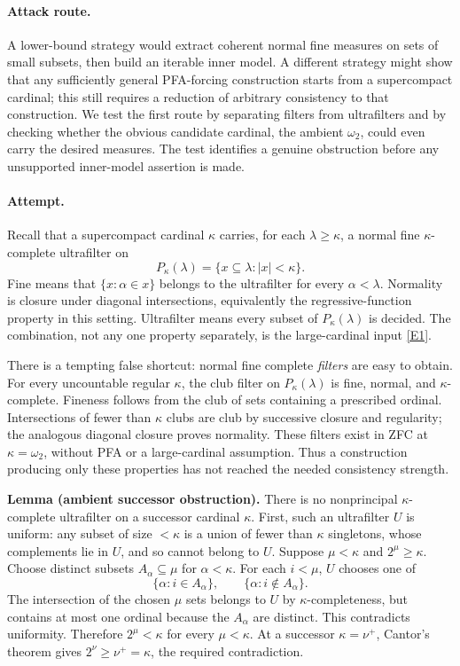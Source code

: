 \documentclass[11pt,a4paper]{article}
\newcommand{\eref}[2]{\hyperlink{extra:#1:#2}{[E#2]}}
\numberwithin{equation}{section}
\begin{document}
\paragraph{Attack route.}
A lower-bound strategy would extract coherent normal fine measures on sets of small subsets, then build an iterable inner model. A different strategy might show that any sufficiently general PFA-forcing construction starts from a supercompact cardinal; this still requires a reduction of arbitrary consistency to that construction. We test the first route by separating filters from ultrafilters and by checking whether the obvious candidate cardinal, the ambient $\omega_2$, could even carry the desired measures. The test identifies a genuine obstruction before any unsupported inner-model assertion is made.

\paragraph{Attempt.}
Recall that a supercompact cardinal $\kappa$ carries, for each $\lambda\ge\kappa$, a normal fine $\kappa$-complete ultrafilter on
\[
 P_\kappa(\lambda)=\{x\subseteq\lambda:|x|<\kappa\}.
\]
Fine means that $\{x:\alpha\in x\}$ belongs to the ultrafilter for every $\alpha<\lambda$. Normality is closure under diagonal intersections, equivalently the regressive-function property in this setting. Ultrafilter means every subset of $P_\kappa(\lambda)$ is decided. The combination, not any one property separately, is the large-cardinal input \eref{30006783}{1}.

There is a tempting false shortcut: normal fine complete \emph{filters} are easy to obtain. For every uncountable regular $\kappa$, the club filter on $P_\kappa(\lambda)$ is fine, normal, and $\kappa$-complete. Fineness follows from the club of sets containing a prescribed ordinal. Intersections of fewer than $\kappa$ clubs are club by successive closure and regularity; the analogous diagonal closure proves normality. These filters exist in ZFC at $\kappa=\omega_2$, without PFA or a large-cardinal assumption. Thus a construction producing only these properties has not reached the needed consistency strength.

\textbf{Lemma (ambient successor obstruction).} There is no nonprincipal $\kappa$-complete ultrafilter on a successor cardinal $\kappa$.
First, such an ultrafilter $U$ is uniform: any subset of size $<\kappa$ is a union of fewer than $\kappa$ singletons, whose complements lie in $U$, and so cannot belong to $U$.
Suppose $\mu<\kappa$ and $2^\mu\ge\kappa$. Choose distinct subsets $A_\alpha\subseteq\mu$ for $\alpha<\kappa$. For each $i<\mu$, $U$ chooses one of
\[
 \{\alpha:i\in A_\alpha\},\qquad\{\alpha:i\notin A_\alpha\}.
\]
The intersection of the chosen $\mu$ sets belongs to $U$ by $\kappa$-completeness, but contains at most one ordinal because the $A_\alpha$ are distinct. This contradicts uniformity. Therefore $2^\mu<\kappa$ for every $\mu<\kappa$. At a successor $\kappa=\nu^+$, Cantor's theorem gives $2^\nu\ge\nu^+=\kappa$, the required contradiction.
\end{document}
